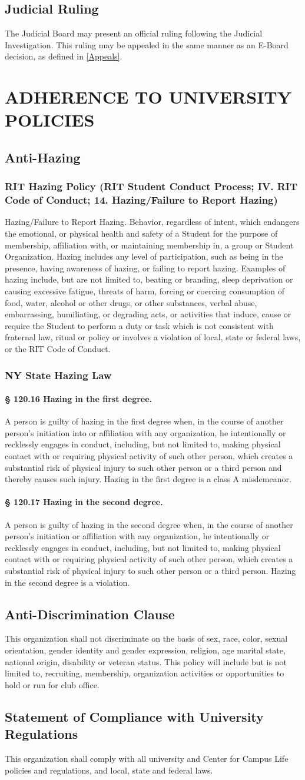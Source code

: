 \documentclass{article}
\newcommand{\article}[1]{\section{#1} \label{#1}}
\newcommand{\asection}[1]{\subsection{#1} \label{#1}}
\newcommand{\asubsection}[1]{\subsubsection{#1} \label{#1}}
\newcommand{\asubsubsection}[1]{\paragraph{#1} \label{#1}}
\begin{document}
\asection{Judicial Ruling}
The Judicial Board may present an official ruling following the Judicial Investigation.
This ruling may be appealed in the same manner as an E-Board decision, as defined in \ref{Appeals}.

\article{ADHERENCE TO UNIVERSITY POLICIES}

\asection{Anti-Hazing}

\asubsection{RIT Hazing Policy (RIT Student Conduct Process; IV. RIT Code of Conduct; 14. Hazing/Failure to Report Hazing)}
Hazing/Failure to Report Hazing.
Behavior, regardless of intent, which endangers the emotional, or physical health and safety of a Student for the purpose of membership, affiliation with, or maintaining membership in, a group or Student Organization.
Hazing includes any level of participation, such as being in the presence, having awareness of hazing, or failing to report hazing.
Examples of hazing include, but are not limited to, beating or branding, sleep deprivation or causing excessive fatigue, threats of harm, forcing or coercing consumption of food, water, alcohol or other drugs, or other substances, verbal abuse, embarrassing, humiliating, or degrading acts, or activities that induce, cause or require the Student to perform a duty or task which is not consistent with fraternal law, ritual or policy or involves a violation of local, state or federal laws, or the RIT Code of Conduct.

\asubsection{NY State Hazing Law}

\asubsubsection{§ 120.16 Hazing in the first degree.}
A person is guilty of hazing in the first degree when, in the course of another person's initiation into or affiliation with any organization, he intentionally or recklessly engages in conduct, including, but not limited to, making physical contact with or requiring physical activity of such other person, which creates a substantial risk of physical injury to such other person or a third person and thereby causes such injury.
Hazing in the first degree is a class A misdemeanor.

\asubsubsection{§ 120.17 Hazing in the second degree.}
A person is guilty of hazing in the second degree when, in the course of another person's initiation or affiliation with any organization, he intentionally or recklessly engages in conduct, including, but not limited to, making physical contact with or requiring physical activity of such other person, which creates a substantial risk of physical injury to such other person or a third person.
Hazing in the second degree is a violation.

\asection{Anti-Discrimination Clause}
This organization shall not discriminate on the basis of sex, race, color, sexual orientation, gender identity and gender expression, religion, age marital state, national origin, disability or veteran status.
This policy will include but is not limited to, recruiting, membership, organization activities or opportunities to hold or run for club office.

\asection{Statement of Compliance with University Regulations}
This organization shall comply with all university and Center for Campus Life policies and regulations, and local, state and federal laws.
\end{document}
